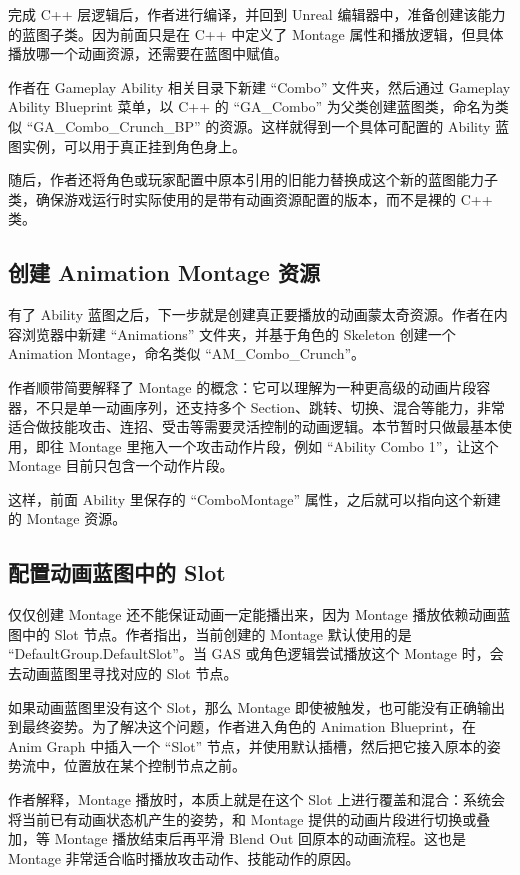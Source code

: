 完成 C++ 层逻辑后，作者进行编译，并回到 Unreal 编辑器中，准备创建该能力的蓝图子类。因为前面只是在 C++ 中定义了 Montage 属性和播放逻辑，但具体播放哪一个动画资源，还需要在蓝图中赋值。

作者在 Gameplay Ability 相关目录下新建 ``Combo'' 文件夹，然后通过 Gameplay Ability Blueprint 菜单，以 C++ 的 ``GA\_Combo'' 为父类创建蓝图类，命名为类似 ``GA\_Combo\_Crunch\_BP'' 的资源。这样就得到一个具体可配置的 Ability 蓝图实例，可以用于真正挂到角色身上。

随后，作者还将角色或玩家配置中原本引用的旧能力替换成这个新的蓝图能力子类，确保游戏运行时实际使用的是带有动画资源配置的版本，而不是裸的 C++ 类。

\subsection{创建 Animation Montage 资源}

有了 Ability 蓝图之后，下一步就是创建真正要播放的动画蒙太奇资源。作者在内容浏览器中新建 ``Animations'' 文件夹，并基于角色的 Skeleton 创建一个 Animation Montage，命名类似 ``AM\_Combo\_Crunch''。

作者顺带简要解释了 Montage 的概念：它可以理解为一种更高级的动画片段容器，不只是单一动画序列，还支持多个 Section、跳转、切换、混合等能力，非常适合做技能攻击、连招、受击等需要灵活控制的动画逻辑。本节暂时只做最基本使用，即往 Montage 里拖入一个攻击动作片段，例如 ``Ability Combo 1''，让这个 Montage 目前只包含一个动作片段。

这样，前面 Ability 里保存的 ``ComboMontage'' 属性，之后就可以指向这个新建的 Montage 资源。

\subsection{配置动画蓝图中的 Slot}

仅仅创建 Montage 还不能保证动画一定能播出来，因为 Montage 播放依赖动画蓝图中的 Slot 节点。作者指出，当前创建的 Montage 默认使用的是 ``DefaultGroup.DefaultSlot''。当 GAS 或角色逻辑尝试播放这个 Montage 时，会去动画蓝图里寻找对应的 Slot 节点。

如果动画蓝图里没有这个 Slot，那么 Montage 即使被触发，也可能没有正确输出到最终姿势。为了解决这个问题，作者进入角色的 Animation Blueprint，在 Anim Graph 中插入一个 ``Slot'' 节点，并使用默认插槽，然后把它接入原本的姿势流中，位置放在某个控制节点之前。

作者解释，Montage 播放时，本质上就是在这个 Slot 上进行覆盖和混合：系统会将当前已有动画状态机产生的姿势，和 Montage 提供的动画片段进行切换或叠加，等 Montage 播放结束后再平滑 Blend Out 回原本的动画流程。这也是 Montage 非常适合临时播放攻击动作、技能动作的原因。

